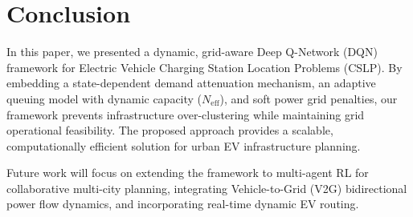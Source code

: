 \documentclass[10pt, conference, a4paper, compsocconf]{IEEEtran}
\begin{document}
\section{Conclusion}
\label{sec:conclusion}

In this paper, we presented a dynamic, grid-aware Deep Q-Network (DQN) framework for Electric Vehicle Charging Station Location Problems (CSLP). By embedding a state-dependent demand attenuation mechanism, an adaptive queuing model with dynamic capacity ($N_{\text{eff}}$), and soft power grid penalties, our framework prevents infrastructure over-clustering while maintaining grid operational feasibility. The proposed approach provides a scalable, computationally efficient solution for urban EV infrastructure planning.

Future work will focus on extending the framework to multi-agent RL for collaborative multi-city planning, integrating Vehicle-to-Grid (V2G) bidirectional power flow dynamics, and incorporating real-time dynamic EV routing.



\end{document}
